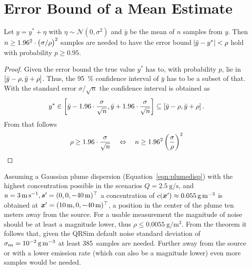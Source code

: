 \chapter{Error Bound of a Mean Estimate}\label{sec:decnoise}
\begin{theorem}
    Let $y = y^* + \eta$ with $\eta \sim \mathcal N(0, \sigma^2)$ and $\bar y$ 
    be the mean of $n$ samples from $y$. Then $n \geq 1.96^2 \cdot \del{\sigma 
        / \rho}^2$ samples are needed to have the error bound $\abs{\bar{y} 
        - y^*} < \rho$ hold with probability $p \geq 0.95$.
\end{theorem}

\begin{proof}
    Given the error bound the true value $y^*$ has to, with probability $p$, lie 
    in $\intcc{\bar y - \rho, \bar y + \rho}$. Thus, the \SI{95}{\percent} 
    confidence interval of $\bar y$ has to be a subset of that. With the 
    standard error $\sigma / \sqrt{n}$ the confidence interval is obtained as
    \begin{equation*}
        y^* \in \intcc{\bar y - 1.96 \cdot \frac{\sigma}{\sqrt{n}}, \bar{y} 
            + 1.96 \cdot \frac{\sigma}{\sqrt{n}}} \subseteq \intcc{\bar{y} 
            - \rho, \bar y + \rho} \text{.}
    \end{equation*}
    From that follows
    \begin{equation*}
        \rho \geq 1.96 \cdot \frac{\sigma}{\sqrt{n}} \quad\Leftrightarrow\quad 
        n \geq 
        1.96^2 \del{\frac{\sigma}{\rho}}^2
    \end{equation*}
\end{proof}

Assuming a Gaussian plume dispersion (Equation~\ref{eqn:plumedisp}) with the 
highest concentration possible in the scenarios $Q 
= \SI{2.5}{\gram\per\second}$, and
$u = \SI{3}{\meter\per\second}, \bm{s}' = (0, 0, \SI{-40}{\meter})^{\top}$ 
a concentration of $c(\bm{x}') \approx \SI{0.055}{\gram\per\meter\cubed}$ is 
obtained at $\bm{x}' = (\SI{10}{\meter}, 0, \SI{-40}{\meter})^{\top}$, a position in 
the center of the plume ten meters away from the source. For a usable 
measurement the magnitude of noise should be at least a magnitude lower, thus 
$\rho \leq \SI{0.0055}{\gram\per\meter\cubed}$. From the theorem it follows 
that, given the QRSim default noise standard deviation of $\sigma_{\mathrm{sn}} 
= \SI{e-2}{\gram\per\meter\cubed}$ at least 385~samples are needed. Further away 
from the source or with a lower emission rate (which can also be a magnitude 
lower) even more samples would be needed.

